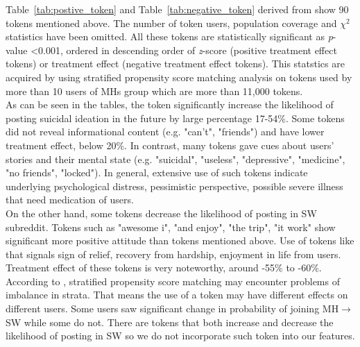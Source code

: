 Table~\ref{tab:postive_token} and Table~\ref{tab:negative_token} derived from \cite{DeChoudhury2016} show 90 tokens mentioned above. The number of token users, population coverage and $\chi^2$ statistics have been omitted. All these tokens are statistically significant as \textit{p}-value \textless 0.001, ordered in descending order of \textit{z}-score (positive treatment effect tokens) or treatment effect (negative treatment effect tokens). This statstics are acquired by using stratified propensity score matching analysis on tokens used by more than 10 users of MHs group which are more than 11,000 tokens.\\
As can be seen in the tables, the token significantly increase the likelihood of posting suicidal ideation in the future by large percentage 17-54\%. Some tokens did not reveal informational content (e.g. "can't", "friends") and have lower treatment effect, below 20\%. In contrast, many tokens gave cues about users' stories and their mental state (e.g. "suicidal", "useless", "depressive", "medicine", "no friends", "locked"). In general, extensive use of such tokens indicate underlying psychological distress, pessimistic perspective, possible severe illness that need medication of users. \\
On the other hand, some tokens decrease the likelihood of posting in SW subreddit. Tokens such as "awesome i", "and enjoy", "the trip", "it work" show significant more positive attitude than tokens mentioned above. Use of tokens like that signals sign of relief, recovery from hardship, enjoyment in life from users. Treatment effect of these tokens is very noteworthy, around -55\% to -60\%.\\
According to \cite{DeChoudhury2017}, stratified propensity score matching may encounter problems of imbalance in strata. That means the use of a token may have different effects on different users. Some users saw significant change in probability of joining  MH$\rightarrow$SW while some do not. There are tokens that both increase and decrease the likelihood of posting in  SW so we do not incorporate such token into our features.\\
